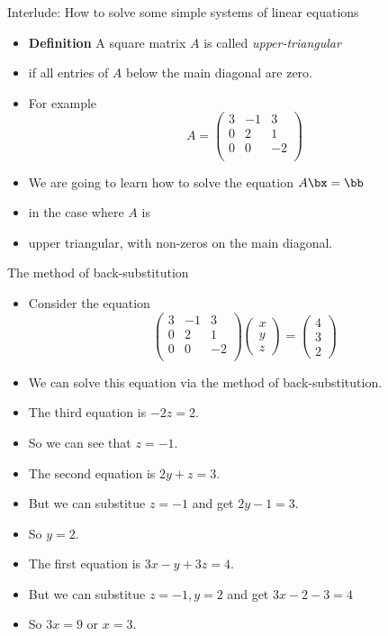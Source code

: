 \documentclass{beamer}
\begin{document}
\begin{frame}{Interlude: How to solve some simple systems of linear equations}

\begin{itemize}
\item \textbf{Definition} A square matrix $A$ is called \emph{upper-triangular}
\item if all entries of $A$ below the main diagonal are zero.
\item For example
$$A=
\begin{pmatrix}
3 & -1  & 3 \\
0 & 2  & 1 \\
0 & 0 & -2 \\
\end{pmatrix}
$$
\item We are going to learn how to solve the equation $A\bx=\bb$
\item in the case where $A$ is
\item upper triangular, with non-zeros on the main diagonal.
\end{itemize}

\end{frame}


\begin{frame}{The method of back-substitution}

\begin{itemize}
\item Consider the equation
$$
\begin{pmatrix}
3 & -1  & 3 \\
0 & 2  & 1 \\
0 & 0 & -2 \\
\end{pmatrix}
\begin{pmatrix}
x \\ y \\ z
\end{pmatrix}
=
\begin{pmatrix}
4 \\ 3 \\ 2
\end{pmatrix}
$$
\item We can solve this equation via the method of back-substitution.
\item The third equation is $-2z=2$.
\item So we can see that $z=-1$.
\item The second equation is $2y+z = 3$.
\item But we can substitue $z=-1$ and get $2y -1 = 3$.
\item So $y=2$.
\item The first equation is $3x -y +3z = 4$.
\item But we can substitue $z=-1, y=2$ and get $3x -2  - 3 = 4$
\item So $3x = 9$ or $x=3$.
\end{itemize}

\end{frame}
\end{document}
